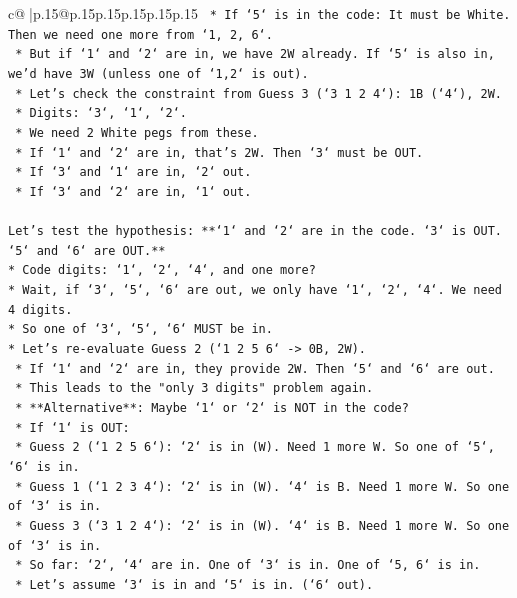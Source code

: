 \documentclass{article}
\begin{document}
{\begin{supertabular}{c@{$\;$}|p{.15\linewidth}@{}p{.15\linewidth}p{.15\linewidth}p{.15\linewidth}p{.15\linewidth}p{.15\linewidth}}
{{{\texttt{    *   If `5` is in the code: It must be White. Then we need one more from `1, 2, 6`.} \\
\texttt{    *   But if `1` and `2` are in, we have 2W already. If `5` is also in, we'd have 3W (unless one of `1,2` is out).} \\
\texttt{    *   Let's check the constraint from Guess 3 (`3 1 2 4`): 1B (`4`), 2W.} \\
\texttt{        *   Digits: `3`, `1`, `2`.} \\
\texttt{        *   We need 2 White pegs from these.} \\
\texttt{        *   If `1` and `2` are in, that's 2W. Then `3` must be OUT.} \\
\texttt{        *   If `3` and `1` are in, `2` out.} \\
\texttt{        *   If `3` and `2` are in, `1` out.} \\
\\ 
\texttt{Let's test the hypothesis: **`1` and `2` are in the code. `3` is OUT. `5` and `6` are OUT.**} \\
\texttt{*   Code digits: `1`, `2`, `4`, and one more?} \\
\texttt{*   Wait, if `3`, `5`, `6` are out, we only have `1`, `2`, `4`. We need 4 digits.} \\
\texttt{*   So one of `3`, `5`, `6` MUST be in.} \\
\texttt{*   Let's re{-}evaluate Guess 2 (`1 2 5 6` {-}> 0B, 2W).} \\
\texttt{    *   If `1` and `2` are in, they provide 2W. Then `5` and `6` are out.} \\
\texttt{    *   This leads to the "only 3 digits" problem again.} \\
\texttt{    *   **Alternative**: Maybe `1` or `2` is NOT in the code?} \\
\texttt{    *   If `1` is OUT:} \\
\texttt{        *   Guess 2 (`1 2 5 6`): `2` is in (W). Need 1 more W. So one of `5`, `6` is in.} \\
\texttt{        *   Guess 1 (`1 2 3 4`): `2` is in (W). `4` is B. Need 1 more W. So one of `3` is in.} \\
\texttt{        *   Guess 3 (`3 1 2 4`): `2` is in (W). `4` is B. Need 1 more W. So one of `3` is in.} \\
\texttt{        *   So far: `2`, `4` are in. One of `3` is in. One of `5, 6` is in.} \\
\texttt{        *   Let's assume `3` is in and `5` is in. (`6` out).} \\
}}}
\end{supertabular}}
\end{document}
